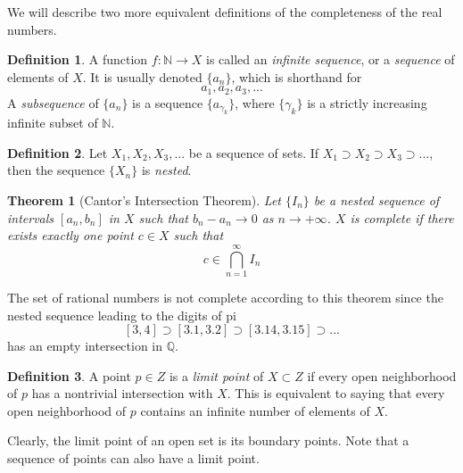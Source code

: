 \documentclass{article}
\newtheorem{theorem}{Theorem}[section]
\theoremstyle{remark}
\theoremstyle{definition}
\newtheorem{definition}{Definition}[section]
\begin{document}
We will describe two more equivalent definitions of the completeness of the real numbers. 

\begin{definition}
A function $f: \mathbb{N} \longrightarrow X$ is called an \textit{infinite sequence}, or a \textit{sequence} of elements of $X$. It is usually denoted $\{a_n\}$, which is shorthand for
\[a_1, a_2, a_3, ...\]
A \textit{subsequence} of $\{ a_n\}$ is a sequence $\{a_{\gamma_k}\}$, where $\{\gamma_k\}$ is a strictly increasing infinite subset of $\mathbb{N}$.
\end{definition}

\begin{definition}
Let $X_1, X_2, X_3, ... $ be a sequence of sets. If $X_1 \supset X_2 \supset X_3 \supset ... $, then the sequence $\{X_n\}$ is \textit{nested}. 
\end{definition}

\begin{theorem}[Cantor's Intersection Theorem]
Let $\{I_n\}$ be a nested sequence of intervals $[a_n, b_n]$ in $X$ such that $b_n - a_n \rightarrow 0$ as $n \rightarrow +\infty$. $X$ is \textit{complete} if there exists exactly one point $c \in X$ such that 
\[c \in \bigcap_{n=1}^\infty I_n \]
\end{theorem}

The set of rational numbers is not complete according to this theorem since the nested sequence leading to the digits of pi
\[[3,4] \supset [3.1,3.2] \supset [3.14,3.15] \supset ... \]
has an empty intersection in $\mathbb{Q}$. 

\begin{definition}
A point $p \in Z$ is a \textit{limit point} of $X \subset Z$ if every open neighborhood of $p$ has a nontrivial intersection with $X$. This is equivalent to saying that every open neighborhood of $p$ contains an infinite number of elements of $X$.  
\end{definition}

Clearly, the limit point of an open set is its boundary points. Note that a sequence of points can also have a limit point. 
\end{document}
